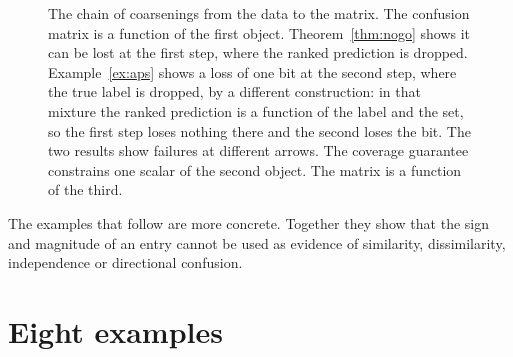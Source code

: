 \documentclass[11pt]{article}
\theoremstyle{definition}
\theoremstyle{definition}
\theoremstyle{remark}
\newcommand{\Prob}{\mathbb{P}}
\begin{document}
\begin{figure}[H]
\centering
{}
\caption{The chain of coarsenings from the data to the matrix. The confusion matrix is a function of
the first object. Theorem~\ref{thm:nogo} shows it can be lost at the first step, where the ranked prediction is
dropped. Example~\ref{ex:aps} shows a loss of one bit at the second step, where the true label is
dropped, by a different construction: in that mixture the ranked prediction is a function of the label and
the set, so the first step loses nothing there and the second loses the bit. The two results show failures
at different arrows. The coverage guarantee constrains one scalar of the second
object. The matrix is a function of the third.}
\label{fig:chain}
\end{figure}

The examples that follow are more concrete. Together they show that the sign and magnitude of an
entry cannot be used as evidence of similarity, dissimilarity, independence or directional
confusion.

\section{Eight examples}\label{sec:examples}
\end{document}
